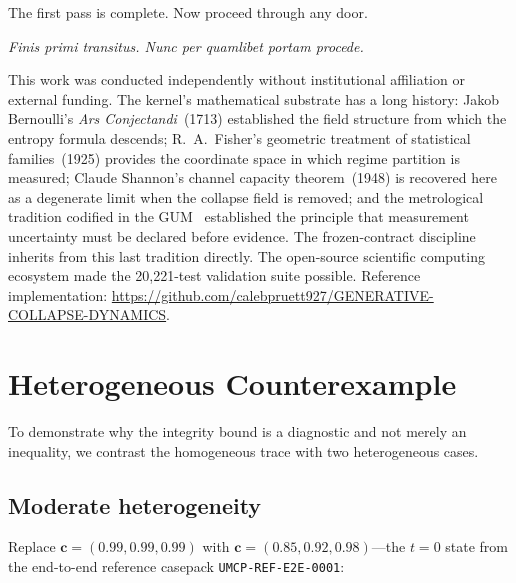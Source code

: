 \documentclass[
  aps,
  prd,
  twocolumn,
  superscriptaddress,
  nofootinbib,
  floatfix
]{revtex4-2}
\newcommand{\tvec}{\mathbf{c}}
\begin{document}
The first pass is complete.  Now proceed through any door.

\emph{Finis primi transitus.  Nunc per quamlibet portam procede.}

\begin{acknowledgments}
This work was conducted independently without institutional
affiliation or external funding.  The kernel's mathematical
substrate has a long history: Jakob Bernoulli's \emph{Ars
Conjectandi}~(1713) established the field structure from which the
entropy formula descends; R.~A.~Fisher's geometric treatment of
statistical families~(1925) provides the coordinate space in which
regime partition is measured; Claude Shannon's channel capacity
theorem~(1948) is recovered here as a degenerate limit when the
collapse field is removed; and the metrological tradition
codified in the GUM~\cite{jcgm2008gum} established the principle
that measurement uncertainty must be declared before evidence.
The frozen-contract discipline inherits from this last tradition
directly.  The open-source scientific computing ecosystem made
the 20{,}221-test validation suite possible.  Reference
implementation:
\url{https://github.com/calebpruett927/GENERATIVE-COLLAPSE-DYNAMICS}.
\end{acknowledgments}

\appendix

\section{Heterogeneous Counterexample}\label{app:heterogeneous}

To demonstrate why the integrity bound is a diagnostic and not merely
an inequality, we contrast the homogeneous trace with two
heterogeneous cases.

\subsection{Moderate heterogeneity}

Replace $\tvec = (0.99, 0.99, 0.99)$ with
$\tvec = (0.85, 0.92, 0.98)$---the $t = 0$ state from the
end-to-end reference casepack \texttt{UMCP-REF-E2E-0001}:
\end{document}
